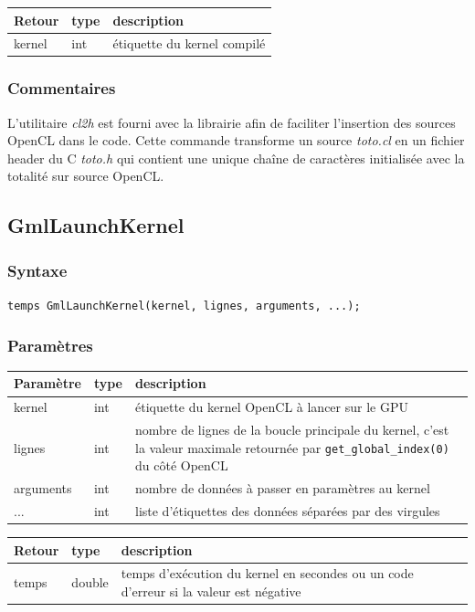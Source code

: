\documentclass[a4paper,12pt]{article}
\begin{document}
\medskip

\begin{tabular}{|m{2cm}|m{1.5cm}|m{10.5cm}|}
\hline
Retour     & type   & description \\
\hline
kernel     & int    & étiquette du kernel compilé \\
\hline
\end{tabular}

\subsubsection*{Commentaires}
L'utilitaire \emph{cl2h} est fourni avec la librairie afin de faciliter l'insertion des sources OpenCL dans le code. Cette commande transforme un source \emph{toto.cl} en un fichier header du C \emph{toto.h} qui contient une unique chaîne de caractères initialisée avec la totalité sur source OpenCL.


\subsection{GmlLaunchKernel}
\subsubsection*{Syntaxe}
{\tt temps GmlLaunchKernel(kernel, lignes, arguments, ...);}
\subsubsection*{Paramètres}

\begin{tabular}{|m{2cm}|m{1.5cm}|m{10.5cm}|}
\hline
Paramètre  & type   & description \\
\hline
kernel     & int   & étiquette du kernel OpenCL à lancer sur le GPU \\
\hline
lignes     & int   & nombre de lignes de la boucle principale du kernel, c'est la valeur maximale retournée par {\tt get\_global\_index(0)} du côté OpenCL \\
\hline
arguments  & int   & nombre de données à passer en paramètres au kernel \\
\hline
...        & int   & liste d'étiquettes des données séparées par des virgules \\
\hline
\end{tabular}

\medskip

\begin{tabular}{|m{2cm}|m{1.5cm}|m{10.5cm}|}
\hline
Retour     & type   & description \\
\hline
temps      & double & temps d'exécution du kernel en secondes ou un code d'erreur si la valeur est négative \\
\hline
\end{tabular}
\end{document}
